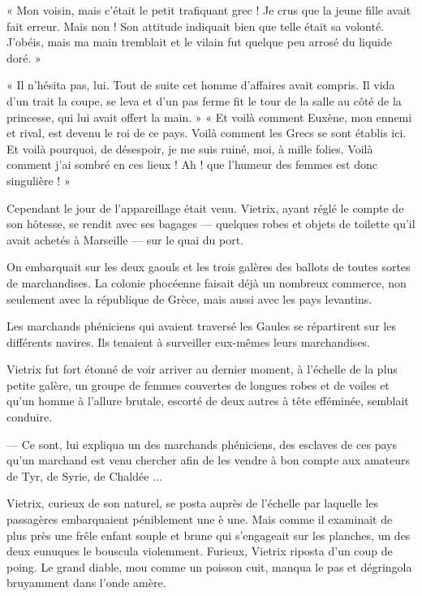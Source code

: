 \documentclass[a4paper, 11pt, oneside, polutonikogreek, french]{article}
\begin{document}
« Mon voisin, mais c'était le petit trafiquant grec ! Je crus que la jeune fille avait fait erreur. Mais non ! Son attitude indiquait bien que telle était sa volonté. J'obéis, mais ma main tremblait et le vilain fut quelque peu arrosé du liquide doré. »

« Il n'hésita pas, lui. Tout de suite cet homme d'affaires avait compris. Il vida d'un trait la coupe, se leva et d'un pas ferme fit le tour de la salle au côté de la princesse, qui lui avait offert la main. »
 «  Et voilà comment Euxène, mon ennemi et rival, est devenu le roi de ce pays. Voilà comment les Grecs se sont établis ici. Et voilà pourquoi, de désespoir, je me suis ruiné, moi, à mille folies. Voilà comment j'ai sombré en ces lieux ! Ah ! que l'humeur des femmes est donc singulière ! »

\bigskip
\centerline{\EightStarTaper}
\centerline{\EightStarTaper\EightStarTaper}
\bigskip

Cependant le jour de l'appareillage était venu. Vietrix, ayant réglé le compte de son hôtesse, se rendit avec ses bagages --- quelques robes et objets de toilette qu'il avait achetés à Marseille --- sur le quai du port.

On embarquait sur les deux gaouls et les trois galères des ballots de toutes sortes de marchandises. La colonie phocéenne faisait déjà un nombreux commerce, non seulement avec la république de Grèce, mais aussi avec les pays levantins.

Les marchands phéniciens qui avaient traversé les Gaules se répartirent sur les différents navires. Ils tenaient à surveiller eux-mêmes leurs marchandises.

Vietrix fut fort étonné de voir arriver au dernier moment, à l'échelle de la plus petite galère, un groupe de femmes couvertes de longues robes et de voiles et qu'un homme à l'allure brutale, escorté de deux autres à tête efféminée, semblait conduire.

--- Ce sont, lui expliqua un des marchands phéniciens, des esclaves de ces pays qu'un marchand est venu chercher afin de les vendre à bon compte aux amateurs de Tyr, de Syrie, de Chaldée ...

Vietrix, curieux de son naturel, se posta auprès de l'échelle par laquelle les passagères embarquaient péniblement une è une. Mais comme il examinait de plus près une frêle enfant souple et brune qui s'engageait sur les planches, un des deux eunuques le bouscula violemment. Furieux, Vietrix riposta d'un coup de poing. Le grand diable, mou comme un poisson cuit, manqua le pas et dégringola bruyamment dans l'onde amère.
\end{document}
